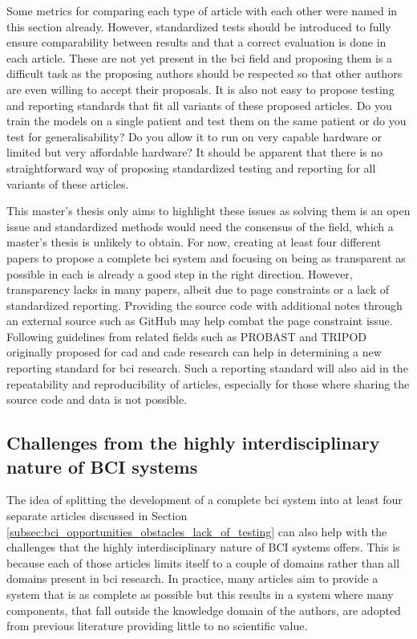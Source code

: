 Some metrics for comparing each type of article with each other were named in this section already.
However, standardized tests should be introduced to fully ensure comparability between results and that a correct evaluation is done in each article.
These are not yet present in the \gls{bci} field and proposing them is a difficult task as the proposing authors should be respected so that other authors are even willing to accept their proposals.
It is also not easy to propose testing and reporting standards that fit all variants of these proposed articles.
Do you train the models on a single patient and test them on the same patient or do you test for generalisability?
Do you allow it to run on very capable hardware or limited but very affordable hardware?
It should be apparent that there is no straightforward way of proposing standardized testing and reporting for all variants of these articles.

This master's thesis only aims to highlight these issues as solving them is an open issue and standardized methods would need the consensus of the field, which a master's thesis is unlikely to obtain.
For now, creating at least four different papers to propose a complete \gls{bci} system and focusing on being as transparent as possible in each is already a good step in the right direction.
However, transparency lacks in many papers, albeit due to page constraints or a lack of standardized reporting.
Providing the source code with additional notes through an external source such as GitHub may help combat the page constraint issue.
Following guidelines from related fields such as PROBAST  \citep{probast} and TRIPOD  \citep{tripod} originally proposed for \gls{cad} and \gls{cade} research can help in determining a new reporting standard for \gls{bci} research.
Such a reporting standard will also aid in the repeatability and reproducibility of articles, especially for those where sharing the source code and data is not possible.


\subsection{Challenges from the highly interdisciplinary nature of BCI systems}
\label{subsec:bci_opportunities_obstacles_interdisciplinary}

The idea of splitting the development of a complete \gls{bci} system into at least four separate articles discussed in Section \ref{subsec:bci_opportunities_obstacles_lack_of_testing} can also help with the challenges that the highly interdisciplinary nature of BCI systems offers.
This is because each of those articles limits itself to a couple of domains rather than all domains present in \gls{bci} research.
In practice, many articles aim to provide a system that is as complete as possible but this results in a system where many components, that fall outside the knowledge domain of the authors, are adopted from previous literature providing little to no scientific value.

